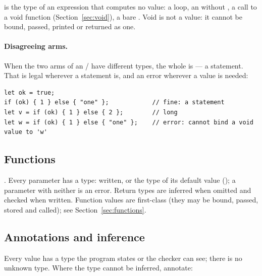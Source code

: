  is the type of an expression that computes no value: a loop,
an  without , a call to a void function
(Section~\ref{sec:void}), a bare . Void is not a value: it
cannot be bound, passed, printed or returned as one.

\paragraph{Disagreeing  arms.} When the two arms of an
/ have different types, the whole  is
 --- a statement. That is legal wherever a statement is, and
an error wherever a value is needed:

\begin{lstlisting}
let ok = true;
if (ok) { 1 } else { "one" };            // fine: a statement
let v = if (ok) { 1 } else { 2 };        // long
let w = if (ok) { 1 } else { "one" };    // error: cannot bind a void value to 'w'
\end{lstlisting}

\subsection{Functions}

. Every parameter has a type: written, or the type
of its default value (); a parameter with neither is an
error. Return types are inferred when omitted and checked when written.
Function values are first-class (they may be bound, passed, stored and
called); see Section~\ref{sec:functions}.

\subsection{Annotations and inference}
\label{sec:annotations}

Every value has a type the program states or the checker can see; there
is no unknown type. Where the type cannot be inferred, annotate:

